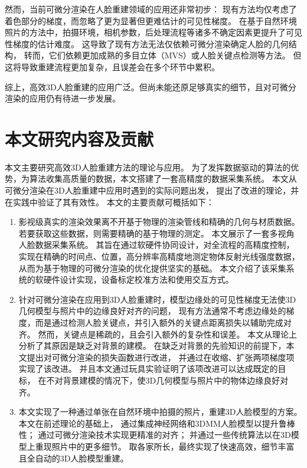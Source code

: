 然而，当前可微分渲染在人脸重建领域的应用还非常初步：
现有方法均仅考虑了着色部分的梯度，而忽略了更为显著但更难估计的可见性梯度。
在基于自然环境照片的方法中，拍摄环境，相机参数，后处理流程等诸多不确定因素更提升了可见性梯度的估计难度。
这导致了现有方法无法仅依赖可微分渲染确定人脸的几何结构，
转而，它们依赖更加成熟的多目立体（MVS）或人脸关键点检测等方法。
但这将导致重建流程更加复杂，且误差会在多个环节中累积。

综上，高效3D人脸重建的应用广泛。但尚未能还原足够真实的细节，且对可微分渲染的应用仍有待进一步发展。

\section{本文研究内容及贡献}

本文主要研究高效3D人脸重建方法的理论与应用。
为了发挥数据驱动的算法的优势，为算法收集高质量的数据，本文搭建了一套高精度的数据采集系统。
本文从可微分渲染在3D人脸重建中应用时遇到的实际问题出发，
提出了改进的理论，并在实践中验证了其有效性。
本文的主要贡献可概括如下：

\begin{enumerate}
\item 影视级真实的渲染效果离不开基于物理的渲染管线和精确的几何与材质数据。
若要获取这些数据，则需要精确的基于物理的测定。
本文展示了一套多视角人脸数据采集系统。
其旨在通过软硬件协同设计，对全流程的高精度控制，实现在精确的时间点、位置，高分辨率高精度地测定物体反射光线强度数据，
从而为基于物理的可微分渲染的优化提供坚实的基础。
本文介绍了该采集系统的软硬件设计实现，设备标定校准方法和使用交互方式。

\item 针对可微分渲染在应用到3D人脸重建时，模型边缘处的可见性梯度无法使3D几何模型与照片中的边缘良好对齐的问题，
现有方法\citep{deep3d}通常不考虑边缘处的梯度，而是通过检测人脸关键点，并引入额外的关键点距离损失以辅助完成对齐。
然而，关键点是稀疏的，且会引入额外的复杂性和误差。
本文从理论上分析了其原因是缺乏对背景的建模。
在缺乏对背景的先验知识的前提下，本文提出对可微分渲染的损失函数进行改进，
并通过在收缩、扩张两项梯度项实现了该改进。
并且本文通过玩具实验证明了该项改进可以达成既定的目标，
在不对背景建模的情况下，使3D几何模型与照片中的物体边缘良好对齐。

\item 本文实现了一种通过单张在自然环境中拍摄的照片，重建3D人脸模型的方案。
本文在前述理论的基础上，
通过集成神经网络和3DMM人脸模型以提升鲁棒性；
通过可微分渲染技术实现更精准的对齐；
并通过一些传统算法以在3D模型上重现照片中的更多细节。
取各家所长，最终实现了快速高效，细节丰富且全自动的3D人脸模型重建。

\end{enumerate}

